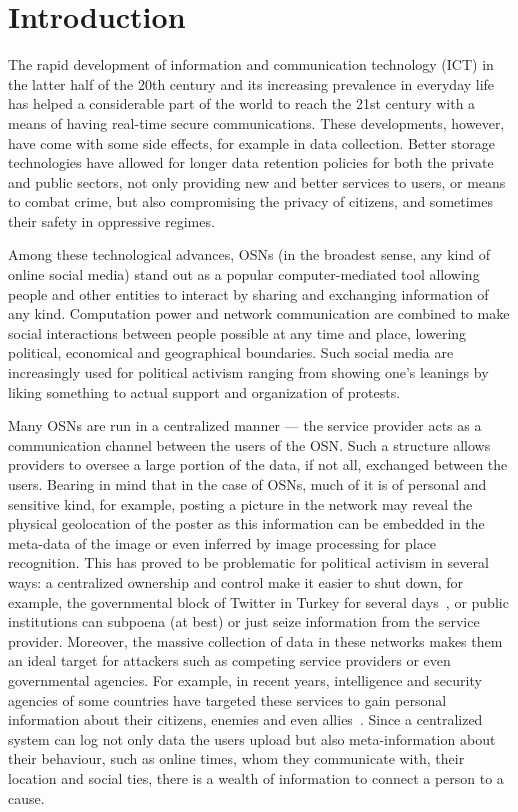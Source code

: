 \section{Introduction}
\label{Introduction}
The rapid development of information and communication technology (ICT) in the latter half of the
20th century and its increasing prevalence in
everyday life has helped a considerable part of the world to reach the
21st century with a means of having real-time secure
communications.  These developments, however,  have come
with some side effects, for example in data collection. Better storage
technologies have allowed for longer data retention policies for both
the private and public sectors, not only providing new and better
services to users, or means to combat crime, but also compromising the privacy of
citizens, and sometimes their safety in oppressive regimes.

Among these technological advances, \acp{OSN} (in the broadest sense,
any kind of online social media) stand out as a popular
computer-mediated tool allowing people and other entities to interact
by sharing and exchanging information of any kind. Computation power
and network communication are combined to make social interactions
between people possible at any time and place, lowering
political, economical and geographical boundaries. Such social media
are increasingly used for political activism ranging from showing
one's leanings by liking something to actual support and organization
of protests.

Many \acp{OSN} are run in a centralized manner --- the service
provider acts as a communication channel between the users of the
\ac{OSN}. Such a structure allows providers to oversee a large portion
of the data, if not all, exchanged between the users. Bearing in mind
that in the case of \acp{OSN}, much of it is of personal and sensitive
kind, for example, posting a picture in the network may reveal the
physical geolocation of the poster as this information can be embedded
in the meta-data of the image or even inferred by image processing for
place recognition. This has proved to be problematic for political
activism in several ways: a centralized ownership and control make it
easier to shut down, for example, the governmental block of Twitter in
Turkey for several days~\cite{TurkeyBansTwitter}, or public
institutions can subpoena (at best) or just seize information from the
service provider. Moreover, the massive collection of data in these
networks makes them an ideal target for attackers such as competing
service providers or even governmental agencies. For example, in
recent years, intelligence and security agencies of some countries
have targeted these services to gain personal information about their
citizens, enemies and even allies~\cite{Prism}. Since a centralized
system can log not only data the users upload but also
meta-information about their behaviour, such as online times, whom
they communicate with, their location and social ties, there is a
wealth of information to connect a person to a cause.

